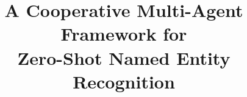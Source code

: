 \documentclass[sigconf,natbib=true,screen=true, review=false]{acmart}
\begin{document}
\title[A Cooperative Multi-Agent Framework for Zero-Shot Named Entity Recognition]{A Cooperative Multi-Agent Framework for \\ Zero-Shot Named Entity Recognition}

\renewcommand{\shortauthors}{Zihan Wang et al.}



\maketitle

\acresetall











\clearpage

\balance



\end{document}
